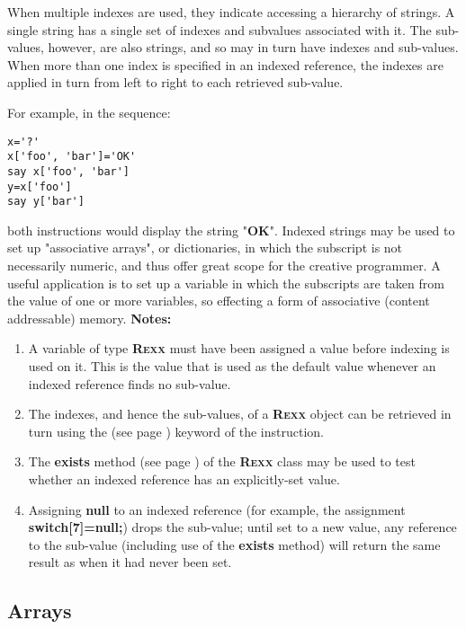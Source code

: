 When multiple indexes are used, they indicate accessing a hierarchy of
strings.  A single \nr{} string has a single set of indexes and
subvalues associated with it.  The sub-values, however, are also \nr{}
strings, and so may in turn have indexes and sub-values.  When more than
one index is specified in an indexed reference, the indexes are applied
in turn from left to right to each retrieved sub-value.
 
For example, in the sequence:
\begin{lstlisting}
x='?'
x['foo', 'bar']='OK'
say x['foo', 'bar']
y=x['foo']
say y['bar']
\end{lstlisting}
both  instructions would display the string
"\textbf{OK}".
 Indexed strings may be used to set up "associative arrays", or
dictionaries, in which the subscript is not necessarily numeric, and
thus offer great scope for the creative programmer.
A useful application is to set up a variable in which the subscripts
are taken from the value of one or more variables, so effecting a form
of associative (content addressable) memory.
 \textbf{Notes:}
\begin{enumerate}
\item 
A variable of type \textbf{R\textsc{exx}} must have been assigned a value
before indexing is used on it.
This is the value that is used as the default value whenever an indexed
reference finds no sub-value.
\item 
The indexes, and hence the sub-values, of a \textbf{R\textsc{exx}} object can
be retrieved in turn using the   (see page \pageref{refloopov})  keyword
of the  instruction.
\item 
The  \textbf{exists} method (see page \pageref{refexists})  of the \textbf{R\textsc{exx}}
class may be used to test whether an indexed reference has an
explicitly-set value.
\item 
Assigning \textbf{null} to an indexed reference (for example, the
assignment \\ \textbf{switch[7]=null;}) drops the sub-value;
until set to a new value, any reference to the sub-value (including use
of the \textbf{exists} method) will return the same result as
when it had never been set.
\end{enumerate}
\subsection{Arrays}\label{refarray}
 
